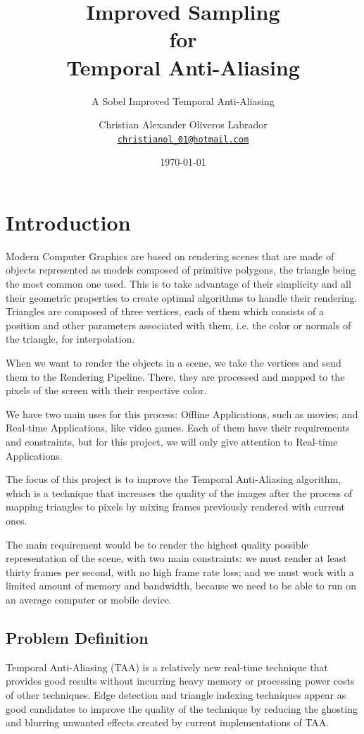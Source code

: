 \documentclass{cslthse-msc}
\author{
	Christian Alexander Oliveros Labrador \\
	{\normalsize \href{mailto:christianol_01@hotmail.com}{\texttt{christianol\_01@hotmail.com}}}
}
\title{Improved Sampling \\for \\Temporal Anti-Aliasing}
\subtitle{A Sobel Improved Temporal Anti-Aliasing}
\date{\today}
\begin{document}
\makefrontmatter
\chapter[Introduction]{Introduction}
Modern Computer Graphics are based on rendering scenes that are made of objects represented as models composed of primitive polygons, the triangle being the most common one used. This is to take advantage of their simplicity and all their geometric properties to create optimal algorithms to handle their rendering. Triangles are composed of three vertices, each of them which consists of a position and other parameters associated with them, i.e. the color or normals of the triangle, for interpolation. 
 
When we want to render the objects in a scene, we take the vertices and send them to the Rendering Pipeline. There, they are processed and mapped to the pixels of the screen with their respective color.

We have two main uses for this process: Offline Applications, such as movies; and Real-time Applications, like video games. Each of them have their requirements and constraints, but for this project, we will only give attention to Real-time Applications.

The focus of this project is to improve the Temporal Anti-Aliasing algorithm, which is a technique that increases the quality of the images after the process of mapping triangles to pixels by mixing frames previously rendered with current ones.

The main requirement would be to render the highest quality possible representation of the scene, with two main constraints: we must render at least thirty frames per second, with no high frame rate loss; and we must work with a limited amount of memory and bandwidth, because we need to be able to run on an average computer or mobile device.  \cite{Doggett2017EDAN35, Shreiner2011}

\section{Problem Definition}
Temporal Anti-Aliasing (TAA) is a relatively new real-time technique that provides good results without incurring heavy memory or processing power costs of other techniques. Edge detection and triangle indexing techniques appear as good candidates to improve the quality of the technique by reducing the ghosting and blurring unwanted effects created by current implementations of TAA. 
\end{document}

